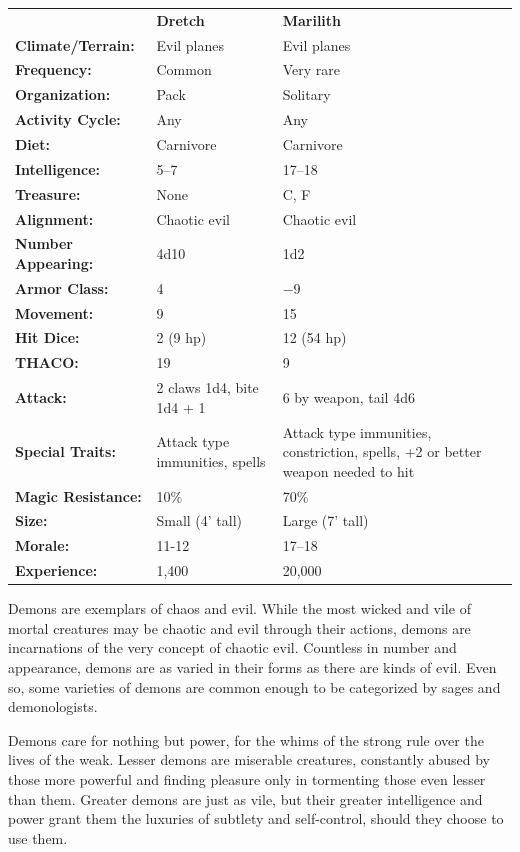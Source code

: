 \begin{multicols}{2}
\begin{minipage}{\columnwidth}
\noindent \begin{tabular}{p{}g{.24\columnwidth}p{.24\columnwidth}}
							& \textbf{Dretch}	& \textbf{Marilith} \\
\textbf{Climate/Terrain:}	& Evil planes	& Evil planes	\\
\textbf{Frequency:} 		& Common	& Very rare	\\
\textbf{Organization:} 		& Pack	& Solitary	\\
\textbf{Activity Cycle:} 	& Any	& Any	\\
\textbf{Diet:} 				& Carnivore	& Carnivore	\\
\textbf{Intelligence:} 		& 5--7	& 17--18	\\
\textbf{Treasure:} 			& None	& C, F	\\
\textbf{Alignment:} 		& Chaotic evil	& Chaotic evil	\\
\hline
\textbf{Number Appearing:} 	& 4d10	& 1d2	\\
\textbf{Armor Class:} 		& 4	& $-9$	\\
\textbf{Movement:} 			& 9	& 15	\\
\textbf{Hit Dice:} 			& 2 (9 hp)	& 12 (54 hp)	\\
\textbf{THACO:} 			& 19	& 9	\\
\textbf{Attack:} 			& 2 claws 1d4, bite 1d4 + 1	& 6 by weapon, tail 4d6	\\
\textbf{Special Traits:} & Attack type immunities, spells	& Attack type immunities, constriction, spells, +2 or better weapon needed to hit	\\
\textbf{Magic Resistance:} 	& 10\%	& 70\%	\\
\textbf{Size:} 				& Small (4' tall)	& Large (7' tall)	\\
\textbf{Morale:} 			& 11-12	& 17--18	\\
\textbf{Experience:} 		& 1,400	& 20,000	\\ %
\end{tabular}

\end{minipage}

Demons are exemplars of chaos and evil. While the most wicked and vile of mortal creatures may be chaotic and evil through their actions, demons are incarnations of the very concept of chaotic evil. Countless in number and appearance, demons are as varied in their forms as there are kinds of evil. Even so, some varieties of demons are common enough to be categorized by sages and demonologists.

Demons care for nothing but power, for the whims of the strong rule over the lives of the weak. Lesser demons are miserable creatures, constantly abused by those more powerful and finding pleasure only in tormenting those even lesser than them. Greater demons are just as vile, but their greater intelligence and power grant them the luxuries of subtlety and self-control, should they choose to use them.


\end{multicols}
